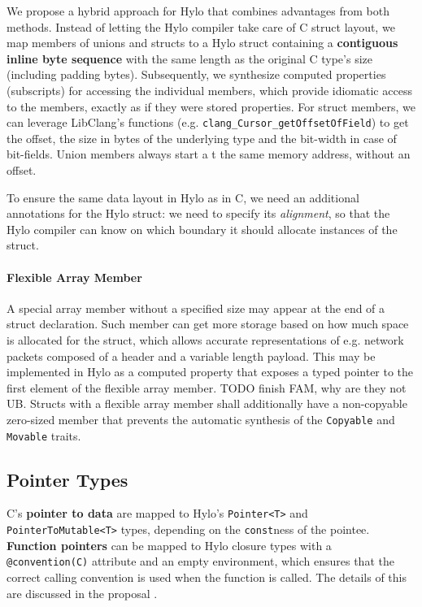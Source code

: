 We propose a hybrid approach for Hylo that combines advantages from both methods. Instead of letting the Hylo compiler take care of C struct layout, we map members of unions and structs to a Hylo struct containing a \textbf{contiguous inline byte sequence} with the same length as the original C type's size (including padding bytes). Subsequently, we synthesize computed properties (subscripts) for accessing the individual members, which provide idiomatic access to the members, exactly as if they were stored properties. For struct members, we can leverage LibClang's functions (e.g. \texttt{clang\_Cursor\_getOffsetOfField}) to get the offset, the size in bytes of the underlying type and the bit-width in case of bit-fields. Union members always start a  t the same memory address, without an offset\cite{c23-struct-and-union-specifiers}.

To ensure the same data layout in Hylo as in C, we need an additional annotations for the Hylo struct: we need to specify its \textit{alignment}, so that the Hylo compiler can know on which boundary it should allocate instances of the struct.

\paragraph{
Flexible Array Member
    }
    \label{par:fam}
    A special array member without a specified size may appear at the end of a struct declaration. Such member can get more storage based on how much space is allocated for the struct, which allows accurate representations of e.g. network packets composed of a header and a variable length payload. This may be implemented in Hylo as a computed property that exposes a typed pointer to the first element of the flexible array member. TODO finish FAM, why are they not UB. Structs with a flexible array member shall additionally have a non-copyable zero-sized member that prevents the automatic synthesis of the \texttt{Copyable} and \texttt{Movable} traits.

\subsection{Pointer Types}
C's \textbf{pointer to data} are mapped to Hylo's \texttt{Pointer<T>} and \texttt{PointerToMutable<T>} types, depending on the \texttt{const}ness of the pointee. \textbf{Function pointers} can be mapped to Hylo closure types with a \texttt{@convention(C)} attribute and an empty environment, which ensures that the correct calling convention is used when the function is called. The details of this are discussed in the proposal \cite{hylo-function-pointers}.

